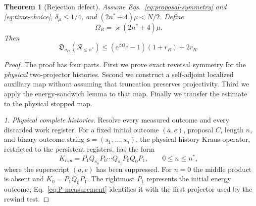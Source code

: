 \documentclass[aps,floatfix,10pt,amssymb,amsmath,superscriptaddress,nofootinbib,longbibliography,nobalancelastpage,twocolumn]{revtex4-2}
\newtheorem{theorem}{Theorem}
\newcommand{\cR}{\mathcal{R}}
\newcommand{\e}{\mathrm{e}}
\begin{document}
\begin{theorem}[Rejection defect]
\label{thm:rejection}
Assume Eqs.~\eqref{eq:proposal-symmetry} and \eqref{eq:time-choice},
$\delta_\mu\leq1/4$, and $(2n^*+4)\mu<N/2$.  Define
\begin{equation}
 \Omega_R=\varkappa(2n^*+4)\mu.
 \label{eq:OmegaR}
\end{equation}
Then
\begin{equation}
 \mathfrak D_{\sigma_G}(\cR_{\leq n^*})
 \leq(\e^{\beta\Omega_R}-1)(1+r_R)+2r_R.
 \label{eq:rejection-bound}
\end{equation}
\end{theorem}
\begin{proof}
The proof has four parts.  First we prove exact reversal symmetry for the
\emph{physical} two-projector histories.  Second we construct a
self-adjoint localized auxiliary map without assuming that truncation
preserves projectivity.  Third we apply the energy-sandwich lemma to that
map.  Finally we transfer the estimate to the physical stopped map.

\emph{1. Physical complete histories.}
Resolve every measured outcome and every discarded work register.  For a
fixed initial outcome $(a,e)$, proposal $C$, length $n$, and binary
outcome string $\bm{s}=(s_1,\ldots,s_n)$, the physical history Kraus
operator, restricted to the persistent registers, has the form
\begin{equation}
 K_{n,\bm{s}}
 =P_1Q_{s_n}P_0\cdots Q_{s_1}P_0Q_0P_1,
 \qquad 0\leq n\leq n^*,
 \label{eq:physical-rejection-history}
\end{equation}
where the superscript $(a,e)$ has been suppressed.  For $n=0$ the
middle product is absent and $K_{0}=P_1Q_0P_1$.  The rightmost $P_1$
represents the initial energy outcome; Eq.~\eqref{eq:P-measurement}
identifies it with the first projector used by the rewind test.


\end{proof}
\end{document}
